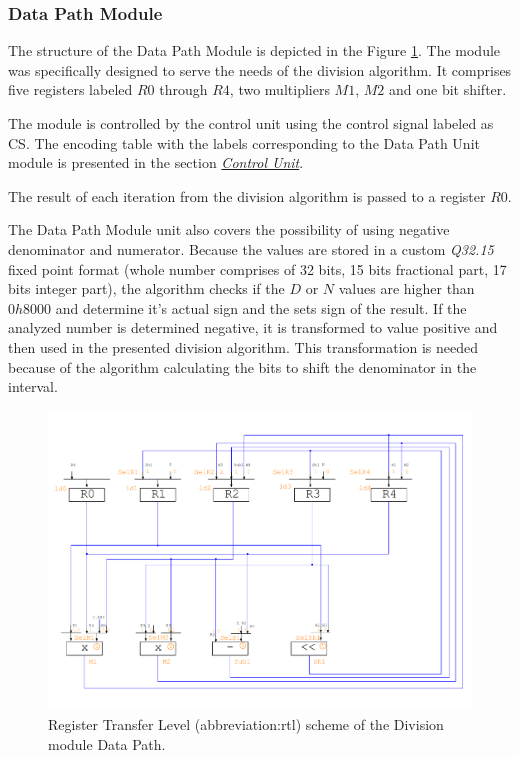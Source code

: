 \documentclass[a4paper, twoside, 11pt]{article}
\begin{document}
\subsubsection{Data Path Module}
The structure of the Data Path Module is depicted in the Figure \ref{fig:division-rtl}. The module was specifically designed to serve the needs of the division algorithm. It comprises five registers labeled $R0$ through $R4$, two multipliers $M1$, $M2$ and one bit shifter.\par
The module is controlled by the control unit using the control signal labeled as CS. The encoding table with the labels corresponding to the Data Path Unit module is presented in the section \hyperref[subsubsec:division-control-unit]{\textit{Control Unit}}.\par
The result of each iteration from the division algorithm is passed to a register $R0$.\par
The Data Path Module unit also covers the possibility of using negative denominator and numerator. Because the values are stored in a custom \textit{Q32.15} fixed point format (whole number comprises of 32 bits, 15 bits fractional part, 17 bits integer part), the algorithm checks if the $D$ or $N$ values are higher than $0h8000$ and determine it's actual sign and the sets sign of the result. If the analyzed number is determined negative, it is transformed to value positive and then used in the presented division algorithm. This transformation is needed because of the algorithm calculating the bits to shift the denominator in the interval.
\begin{figure}[htbp!]
  \centering
  \includegraphics[width=1\textwidth]{src/pdf/rtl.pdf}
    \caption{Register Transfer Level (\gls{abbreviation:rtl}) scheme of the Division module Data Path.}
  \label{fig:division-rtl}
\end{figure}
\end{document}
